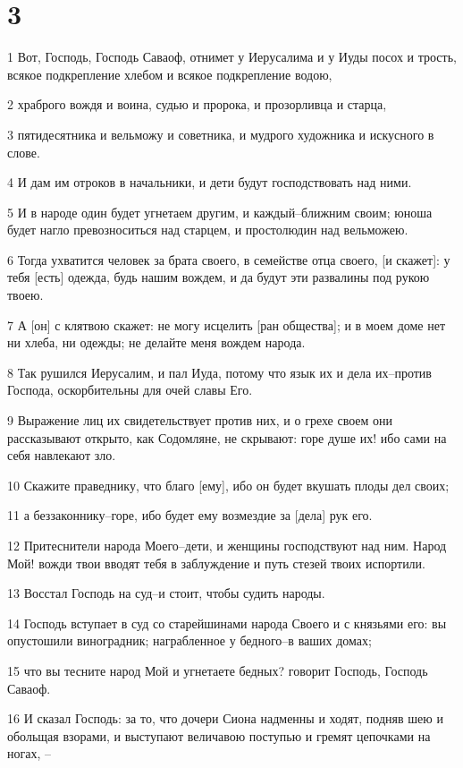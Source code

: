 \chapter{3}

\par 1 Вот, Господь, Господь Саваоф, отнимет у Иерусалима и у Иуды посох и трость, всякое подкрепление хлебом и всякое подкрепление водою,
\par 2 храброго вождя и воина, судью и пророка, и прозорливца и старца,
\par 3 пятидесятника и вельможу и советника, и мудрого художника и искусного в слове.
\par 4 И дам им отроков в начальники, и дети будут господствовать над ними.
\par 5 И в народе один будет угнетаем другим, и каждый--ближним своим; юноша будет нагло превозноситься над старцем, и простолюдин над вельможею.
\par 6 Тогда ухватится человек за брата своего, в семействе отца своего, [и скажет]: у тебя [есть] одежда, будь нашим вождем, и да будут эти развалины под рукою твоею.
\par 7 А [он] с клятвою скажет: не могу исцелить [ран общества]; и в моем доме нет ни хлеба, ни одежды; не делайте меня вождем народа.
\par 8 Так рушился Иерусалим, и пал Иуда, потому что язык их и дела их--против Господа, оскорбительны для очей славы Его.
\par 9 Выражение лиц их свидетельствует против них, и о грехе своем они рассказывают открыто, как Содомляне, не скрывают: горе душе их! ибо сами на себя навлекают зло.
\par 10 Скажите праведнику, что благо [ему], ибо он будет вкушать плоды дел своих;
\par 11 а беззаконнику--горе, ибо будет ему возмездие за [дела] рук его.
\par 12 Притеснители народа Моего--дети, и женщины господствуют над ним. Народ Мой! вожди твои вводят тебя в заблуждение и путь стезей твоих испортили.
\par 13 Восстал Господь на суд--и стоит, чтобы судить народы.
\par 14 Господь вступает в суд со старейшинами народа Своего и с князьями его: вы опустошили виноградник; награбленное у бедного--в ваших домах;
\par 15 что вы тесните народ Мой и угнетаете бедных? говорит Господь, Господь Саваоф.
\par 16 И сказал Господь: за то, что дочери Сиона надменны и ходят, подняв шею и обольщая взорами, и выступают величавою поступью и гремят цепочками на ногах, --
